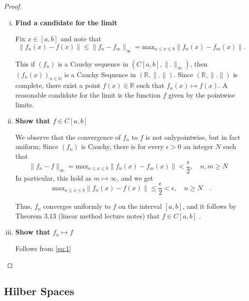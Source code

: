 \documentclass{article}
\theoremstyle{remark}
\begin{document}
\begin{proof}
  \begin{enumerate}[(i)]
    \item \textbf{Find a candidate for the limit}  
    \par  
    Fix $x \in [a,b]$ and note that \[
      \|f_{n}\left( x \right)  - f\left( x \right) \| \le \|f_n - f_m\|_{\infty} = \text{max}_{a \le x \le b } \|f_n\left( x \right) - f_m\left( x \right) \|.
    \] 

    This if $\left( f_n \right) $ is a Cauchy sequence in $\left( C[a,b], \|.\|_{\infty} \right) $, then $\left( f_n\left( x \right)  \right)_{n \in \mathbb{N}} $ is a Cauchy Sequence in $\left( \mathbb{R}, \|.\| \right) $. Since $\left( \mathbb{R}, \|.\| \right) $ is complete, there exist a point $f\left( x \right) \in \mathbb{R}$ such that $f_{n}\left( x \right) \mapsto f\left( x \right) $. A reasonable candidate for the limit is the function $f$ given by the pointwise limits. 

  \item \textbf{Show that $f \in C[a,b]$} 
      \par
      We observe that the convergence of $f_n$ to $f$ is not onlypointwise, but in fact uniform; Since $\left( f_n \right) $ is Cauchy, there is for every $\epsilon > 0 $ an integer $N$ such that \[
        \|f_n - f\|_{\infty} =  \text{max}_{a \le x \le b} \|f_n\left( x \right) -  f_m\left( x \right) \| < \frac{\epsilon}{2}, \quad n,m \ge N \quad  
      \] 
      In particular, this hold as $m \mapsto \infty$, and we get 
      \begin{equation}
      \label{eq:1}
      \text{max}_{a \le x \le b} \|f_n\left( x \right)  - f\left( x \right) \| \le \frac{\epsilon}{2} < \epsilon, \quad n\ge N \quad  
      .\end{equation}

      Thus, $f_n$ converges uniformly to $f$ on the interval $[a,b]$, and it follows by Theorem 3.13 (linear method lecture notes) that $f \in C[a,b]$ .

    \item \textbf{Show that $f_n \mapsto f$} 
        \par
        Follows from \eqref{eq:1} 

  \end{enumerate}
\end{proof}

\subsection{Hilber Spaces}%
\label{sub:hilber_spaces}
\end{document}

